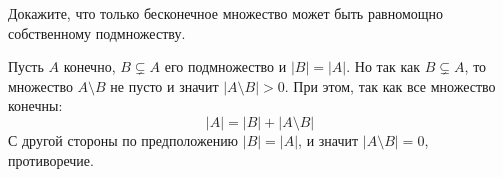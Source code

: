 \documentclass[a4paper,12pt,twoside]{article}
\begin{document}
\begin{?}
    Докажите, что только бесконечное множество может быть равномощно собственному подмножеству.
\end{?}
\begin{solution}{}
    Пусть $A$ конечно, $B \subsetneq A$ его подмножество и $|B| = |A|$. Но так как $B \subsetneq A$, то множество $A \setminus B$ не пусто и значит $|A \setminus B| > 0$. При этом, так как все множество конечны:
    $$
        |A| = |B| + |A \setminus B|
    $$
    С другой стороны по предположению $|B| = |A|$, и значит $|A \setminus B| = 0$, противоречие.
\end{solution}
\end{document}
